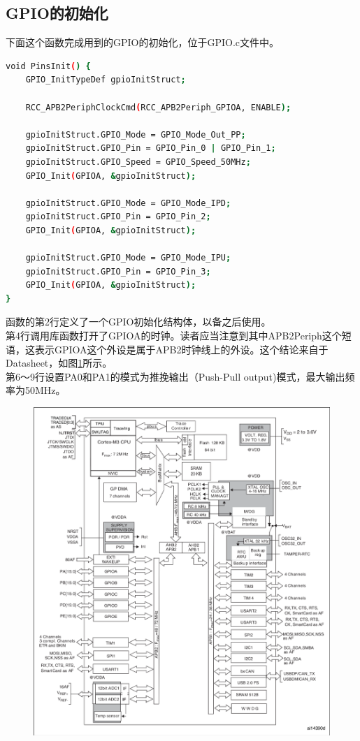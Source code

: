	\subsection{GPIO的初始化}
		下面这个函数完成用到的GPIO的初始化，位于GPIO.c文件中。
		\par 
		\begin{lstlisting}[language=bash, style=customStyleC, caption=GPIO初始化]
void PinsInit() {
	GPIO_InitTypeDef gpioInitStruct;
	
	RCC_APB2PeriphClockCmd(RCC_APB2Periph_GPIOA, ENABLE);
	
	gpioInitStruct.GPIO_Mode = GPIO_Mode_Out_PP;
	gpioInitStruct.GPIO_Pin = GPIO_Pin_0 | GPIO_Pin_1;
	gpioInitStruct.GPIO_Speed = GPIO_Speed_50MHz;
	GPIO_Init(GPIOA, &gpioInitStruct);
	
	gpioInitStruct.GPIO_Mode = GPIO_Mode_IPD;
	gpioInitStruct.GPIO_Pin = GPIO_Pin_2;
	GPIO_Init(GPIOA, &gpioInitStruct);
	
	gpioInitStruct.GPIO_Mode = GPIO_Mode_IPU;
	gpioInitStruct.GPIO_Pin = GPIO_Pin_3;
	GPIO_Init(GPIOA, &gpioInitStruct);
}
		\end{lstlisting}
		\par 
		函数的第2行定义了一个GPIO初始化结构体，以备之后使用。\\
		第4行调用库函数打开了GPIOA的时钟。读者应当注意到其中APB2Periph这个短语，这表示GPIOA这个外设是属于APB2时钟线上的外设。这个结论来自于Datasheet，如图\ref{fig:clockDiag}所示。
		\\
		第6～9行设置PA0和PA1的模式为推挽输出（Push-Pull output)模式，最大输出频率为50MHz。
		\begin{figure}[htbp]
			\includegraphics[width=\textwidth]{images/content/clockDiag.png}
			\label{fig:clockDiag}
		\end{figure}
		
		


















